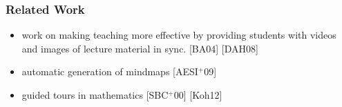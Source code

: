 \begin{frame}
  \frametitle{Related Work}
  \begin{module}[id=relatedWork]
  \begin{itemize}
      \item work on making teaching more effective by providing students with videos and images of lecture material in sync. [BA04] [DAH08]\\
      \item automatic generation of mindmaps [AESI$^+$09]\\
      \item guided tours in mathematics [SBC$^+$00] [Koh12]\\
  \end{itemize}

  \end{module}
\end{frame}
